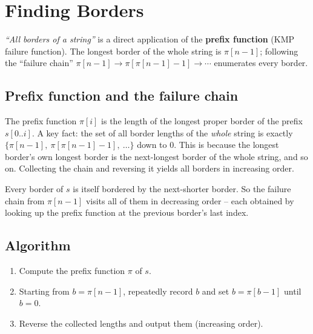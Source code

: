 \section{Finding Borders}
\label{sec:cses-finding-borders}


\begin{patternbox}
\emph{``All borders of a string''} is a direct application of the
\textbf{prefix function} (KMP failure function). The longest border of the
whole string is $\pi[n-1]$; following the ``failure chain''
$\pi[n-1]\to\pi[\pi[n-1]-1]\to\cdots$ enumerates every border.
\end{patternbox}

\subsection*{Prefix function and the failure chain}

The prefix function $\pi[i]$ is the length of the longest proper border of
the prefix $s[0..i]$. A key fact: the set of all border lengths of the
\emph{whole} string is exactly $\{\pi[n-1],\ \pi[\pi[n-1]-1],\ \ldots\}$
down to $0$. This is because the longest border's own longest border is
the next-longest border of the whole string, and so on. Collecting the
chain and reversing it yields all borders in increasing order.

\begin{ideabox}
Every border of $s$ is itself bordered by the next-shorter border. So the
failure chain from $\pi[n-1]$ visits all of them in decreasing order --
each obtained by looking up the prefix function at the previous border's
last index.
\end{ideabox}

\subsection*{Algorithm}

\begin{enumerate}
  \item Compute the prefix function $\pi$ of $s$.
  \item Starting from $b=\pi[n-1]$, repeatedly record $b$ and set
        $b=\pi[b-1]$ until $b=0$.
  \item Reverse the collected lengths and output them (increasing order).
\end{enumerate}

